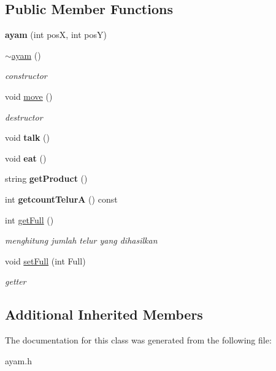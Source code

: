 \subsection*{Public Member Functions}
\begin{DoxyCompactItemize}
\item 
\mbox{\label{classayam_a1f1fdc71bbe1b0b5ff5801792c36ef03}} 
{\bfseries ayam} (int posX, int posY)
\item 
\mbox{\label{classayam_a7af89a6f6a645682f4c55d4dc8a6877c}} 
\hyperlink{classayam_a7af89a6f6a645682f4c55d4dc8a6877c}{$\sim$ayam} ()
\begin{DoxyCompactList}\small\item\em constructor \end{DoxyCompactList}\item 
\mbox{\label{classayam_a876d7b50502197028803b83a3bfe68fc}} 
void \hyperlink{classayam_a876d7b50502197028803b83a3bfe68fc}{move} ()
\begin{DoxyCompactList}\small\item\em destructor \end{DoxyCompactList}\item 
\mbox{\label{classayam_a3f93686590f6e22c28a0d36d6db0322c}} 
void {\bfseries talk} ()
\item 
\mbox{\label{classayam_a1c0d6e74ce4349de2ee7203f5328711a}} 
void {\bfseries eat} ()
\item 
\mbox{\label{classayam_a0fb6f180b3cde59dfbe9107198df6566}} 
string {\bfseries get\+Product} ()
\item 
\mbox{\label{classayam_a42b927ca15fa2720766d0abfc6505b3a}} 
int {\bfseries getcount\+TelurA} () const
\item 
\mbox{\label{classayam_aa9f0e9dd312dc8ed0dcba46f94a77d9a}} 
int \hyperlink{classayam_aa9f0e9dd312dc8ed0dcba46f94a77d9a}{get\+Full} ()
\begin{DoxyCompactList}\small\item\em menghitung jumlah telur yang dihasilkan \end{DoxyCompactList}\item 
\mbox{\label{classayam_aca2103a6a0565ab841f5bebc045f61c7}} 
void \hyperlink{classayam_aca2103a6a0565ab841f5bebc045f61c7}{set\+Full} (int Full)
\begin{DoxyCompactList}\small\item\em getter \end{DoxyCompactList}\end{DoxyCompactItemize}
\subsection*{Additional Inherited Members}


The documentation for this class was generated from the following file\+:\begin{DoxyCompactItemize}
\item 
ayam.\+h\end{DoxyCompactItemize}

